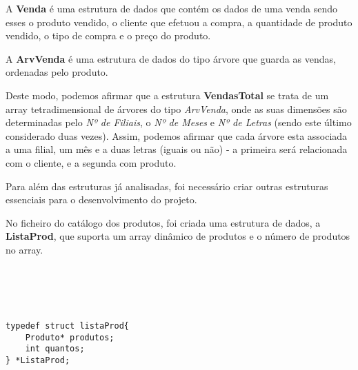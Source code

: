 \documentclass{article}
\begin{document}
A \textbf{Venda} é uma estrutura de dados que contém os dados de uma venda sendo esses o produto vendido, o cliente que efetuou a compra, a quantidade de produto vendido, o tipo de compra e o preço do produto.

A \textbf{ArvVenda} é uma estrutura de dados do tipo árvore que guarda as vendas, ordenadas pelo produto.

Deste modo, podemos afirmar que a estrutura \textbf{VendasTotal} se trata de um array tetradimensional de árvores do tipo \textit{ArvVenda}, onde as suas dimensões são determinadas pelo \textit{Nº de Filiais}, o \textit{Nº de Meses} e \textit{Nº de Letras} (sendo este último considerado duas vezes). Assim, podemos afirmar que cada árvore esta associada a uma filial, um mês e a duas letras (iguais ou não) - a primeira será relacionada com o cliente, e a segunda com produto. 

\vspace{1cm}

Para além das estruturas já analisadas, foi necessário criar outras estruturas essenciais para o desenvolvimento do projeto.
\par No ficheiro do catálogo dos produtos, foi criada uma estrutura de dados, a \textbf{ListaProd}, que suporta um array dinâmico de produtos e o número de produtos no array.
\\ \\ \\ \\ \\

\begin{lstlisting}
typedef struct listaProd{
	Produto* produtos;
	int quantos;
} *ListaProd;

\end{lstlisting}
\end{document}
